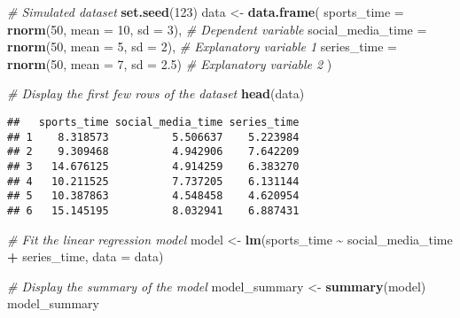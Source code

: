 \documentclass[
]{article}
\newenvironment{Shaded}{\begin{snugshade}}{\end{snugshade}}
\newcommand{\AttributeTok}[1]{\textcolor[rgb]{0.13,0.29,0.53}{#1}}
\newcommand{\CommentTok}[1]{\textcolor[rgb]{0.56,0.35,0.01}{\textit{#1}}}
\newcommand{\DecValTok}[1]{\textcolor[rgb]{0.00,0.00,0.81}{#1}}
\newcommand{\FloatTok}[1]{\textcolor[rgb]{0.00,0.00,0.81}{#1}}
\newcommand{\FunctionTok}[1]{\textcolor[rgb]{0.13,0.29,0.53}{\textbf{#1}}}
\newcommand{\NormalTok}[1]{#1}
\newcommand{\OtherTok}[1]{\textcolor[rgb]{0.56,0.35,0.01}{#1}}
\newcommand{\SpecialCharTok}[1]{\textcolor[rgb]{0.81,0.36,0.00}{\textbf{#1}}}
\begin{document}
\begin{Shaded}
\begin{Highlighting}[]
\CommentTok{\# Simulated dataset}
\FunctionTok{set.seed}\NormalTok{(}\DecValTok{123}\NormalTok{)}
\NormalTok{data }\OtherTok{\textless{}{-}} \FunctionTok{data.frame}\NormalTok{(}
  \AttributeTok{sports\_time =} \FunctionTok{rnorm}\NormalTok{(}\DecValTok{50}\NormalTok{, }\AttributeTok{mean =} \DecValTok{10}\NormalTok{, }\AttributeTok{sd =} \DecValTok{3}\NormalTok{), }\CommentTok{\# Dependent variable}
  \AttributeTok{social\_media\_time =} \FunctionTok{rnorm}\NormalTok{(}\DecValTok{50}\NormalTok{, }\AttributeTok{mean =} \DecValTok{5}\NormalTok{, }\AttributeTok{sd =} \DecValTok{2}\NormalTok{), }\CommentTok{\# Explanatory variable 1}
  \AttributeTok{series\_time =} \FunctionTok{rnorm}\NormalTok{(}\DecValTok{50}\NormalTok{, }\AttributeTok{mean =} \DecValTok{7}\NormalTok{, }\AttributeTok{sd =} \FloatTok{2.5}\NormalTok{) }\CommentTok{\# Explanatory variable 2}
\NormalTok{)}

\CommentTok{\# Display the first few rows of the dataset}
\FunctionTok{head}\NormalTok{(data)}
\end{Highlighting}
\end{Shaded}

\begin{verbatim}
##   sports_time social_media_time series_time
## 1    8.318573          5.506637    5.223984
## 2    9.309468          4.942906    7.642209
## 3   14.676125          4.914259    6.383270
## 4   10.211525          7.737205    6.131144
## 5   10.387863          4.548458    4.620954
## 6   15.145195          8.032941    6.887431
\end{verbatim}

\begin{Shaded}
\begin{Highlighting}[]
\CommentTok{\# Fit the linear regression model}
\NormalTok{model }\OtherTok{\textless{}{-}} \FunctionTok{lm}\NormalTok{(sports\_time }\SpecialCharTok{\textasciitilde{}}\NormalTok{ social\_media\_time }\SpecialCharTok{+}\NormalTok{ series\_time, }\AttributeTok{data =}\NormalTok{ data)}

\CommentTok{\# Display the summary of the model}
\NormalTok{model\_summary }\OtherTok{\textless{}{-}} \FunctionTok{summary}\NormalTok{(model)}
\NormalTok{model\_summary}
\end{Highlighting}
\end{Shaded}
\end{document}
